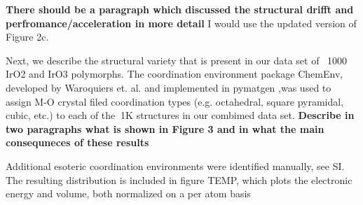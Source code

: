 

{\bf There should be a paragraph which discussed the structural drifft and perfromance/acceleration in more detail}
I would use the updated version of Figure 2c. 


Next, we describe the structural variety that is present in our data set of ~1000 IrO2 and IrO3 polymorphs.
The coordination environment package ChemEnv, developed by Waroquiers et. al. \cite{Waroquiers2017} and implemented in pymatgen \cite{Ong2013},was used to assign M-O crystal filed coordination types (e.g. octahedral, square pyramidal, cubic, etc.) to each of the $~$1K structures in our combimed data set.
{\bf Describe in two paragraphs what is shown in Figure 3 and in what the main consequneces of these results}

%
Additional esoteric coordination environments were identified manually, see SI.
The resulting distribution is included in figure TEMP, which plots the electronic energy and volume, both normalized on a per atom basis



